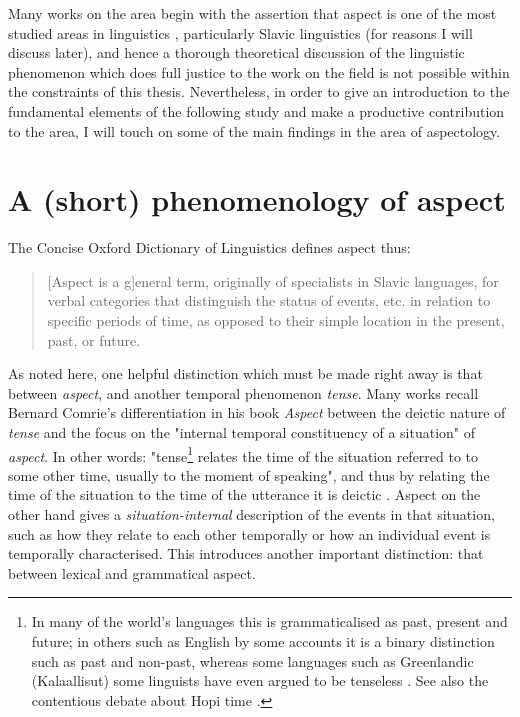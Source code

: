 Many works on the area begin with the assertion that aspect is one of the most studied areas in linguistics \citep{Sasse2002RecentAI}, particularly Slavic linguistics (for reasons I will discuss later), and hence a thorough theoretical discussion of the linguistic phenomenon which does full justice to the work on the field is not possible within the constraints of this thesis. Nevertheless, in order to give an introduction to the fundamental elements of the following study and make a productive contribution to the area, I will touch on some of the main findings in the area of aspectology.
\section{A (short) phenomenology of aspect}
The Concise Oxford Dictionary of Linguistics \citep{matthews2014concise} defines aspect thus: 

\begin{quotation}
    [Aspect is a g]eneral term, originally of specialists in Slavic languages, for verbal categories that distinguish the status of events, etc. in relation to specific periods of time, as opposed to their simple location in the present, past, or future.
\end{quotation}

As noted here, one helpful distinction which must be made right away is that between \emph{aspect}, and another temporal phenomenon \emph{tense}. Many works recall Bernard Comrie's differentiation in his book \emph{Aspect} \citep{comrie1976aspect} between the deictic nature of \emph{tense} and the focus on the "internal temporal constituency of a situation" of \emph{aspect}. In other words: "tense\footnote{In many of the world's languages this is grammaticalised as past, present and future; in others such as English by some accounts \citep{jespersen2013essentials} it is a binary distinction such as past and non-past, whereas some languages such as Greenlandic (Kalaallisut) some linguists have even argued to be tenseless \citet{10.1093/jos/ffh029}. See also the contentious debate about Hopi time \citet{whorf-writings, hopitime}. } relates the time of the situation referred to to some other time, usually to the moment of speaking", and thus by relating the time of the situation to the time of the utterance it is deictic \citep{comrie1976aspect}. Aspect on the other hand gives a \emph{situation-internal} description of the events in that situation, such as how they relate to each other temporally or how an individual event is temporally characterised. This introduces another important distinction: that between lexical and grammatical aspect.

